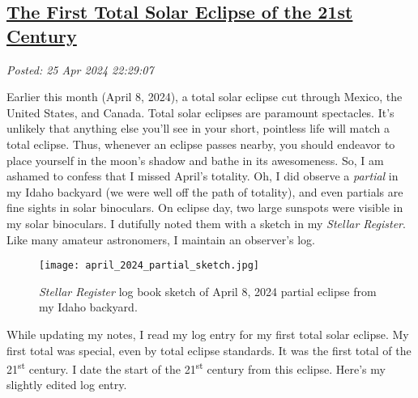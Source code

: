 %

\subsection*{\href{http://analyzethedatanotthedrivel.org/2024/04/25/the-first-total-solar-eclipse-of-the-21st-century/}{The First Total Solar Eclipse of the 21st Century}}


\noindent\emph{Posted: 25 Apr 2024 22:29:07}
\vspace{6pt}

Earlier this month (April 8, 2024), a total solar eclipse cut through
Mexico, the United States, and Canada. Total solar eclipses are
paramount spectacles. It's unlikely that anything else you'll see in
your short, pointless life will match a total eclipse. Thus, whenever an
eclipse passes nearby, you should endeavor to place yourself in the
moon's shadow and bathe in its awesomeness. So, I am ashamed to confess
that I missed April's totality. Oh, I did observe a \emph{partial} in my
Idaho backyard (we were well off the path of totality), and even
partials are fine sights in solar binoculars. On eclipse day, two large
sunspots were visible in my solar binoculars. I dutifully noted them
with a sketch in my \emph{Stellar Register}. Like many amateur
astronomers, I maintain an observer's log.



\captionsetup[figure]{labelformat=empty}
\begin{SCfigure}
\centering
\texttt{[image: april\_2024\_partial\_sketch.jpg]}
\caption{\emph{Stellar Register} log book sketch of April 8, 2024
partial eclipse from my Idaho backyard.}
\label{fig:8074X0}
\end{SCfigure}

While updating my notes, I read my log entry for my first total solar
eclipse. My first total was special, even by total eclipse standards. It
was the first total of the 21\textsuperscript{st} century. I date the
start of the 21\textsuperscript{st} century from this eclipse. Here's my
slightly edited log entry.

